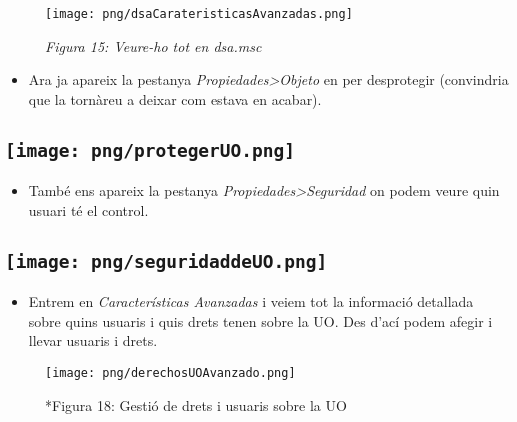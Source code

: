 \documentclass[
  a4paper,
]{article}
\providecommand{\tightlist}{%
  \setlength{\itemsep}{0pt}\setlength{\parskip}{0pt}}
\begin{document}
\begin{figure}
\centering
\texttt{[image: png/dsaCarateristicasAvanzadas.png]}
\caption{\emph{Figura 15: Veure-ho tot en dsa.msc}}
\end{figure}

\begin{itemize}
\tightlist
\item
  Ara ja apareix la pestanya \emph{Propiedades\textgreater Objeto} en
  per desprotegir (convindria que la tornàreu a deixar com estava en
  acabar).
\end{itemize}

\subsection{\texorpdfstring{\protect\texttt{[image: png/protegerUO.png]}}{Figura 16: Desprotegir temporalment les UO}}\label{figura-16-desprotegir-temporalment-les-uo}

\begin{itemize}
\tightlist
\item
  També ens apareix la pestanya \emph{Propiedades\textgreater Seguridad}
  on podem veure quin usuari té el control.
\end{itemize}

\subsection{\texorpdfstring{\protect\texttt{[image: png/seguridaddeUO.png]}}{Figura 17: Qui té el control de la UO}}\label{figura-17-qui-tuxe9-el-control-de-la-uo}

\begin{itemize}
\tightlist
\item
  Entrem en \emph{Características Avanzadas} i veiem tot la informació
  detallada sobre quins usuaris i quis drets tenen sobre la UO. Des
  d'ací podem afegir i llevar usuaris i drets.
\end{itemize}

\begin{figure}
\centering
\texttt{[image: png/derechosUOAvanzado.png]}
\caption{*Figura 18: Gestió de drets i usuaris sobre la UO}
\end{figure}
\end{document}
